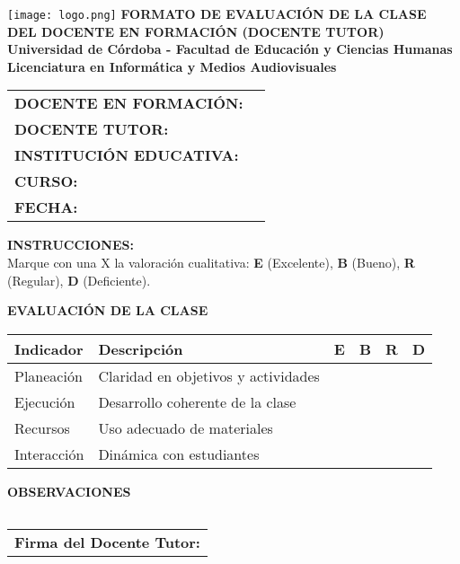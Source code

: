 \documentclass[a4paper,12pt]{article}
\begin{document}
\begin{center}
    \vspace*{1cm}
    \texttt{[image: logo.png]} %
    \vspace{0.5cm}
    \textbf{\Large FORMATO DE EVALUACIÓN DE LA CLASE DEL DOCENTE EN FORMACIÓN (DOCENTE TUTOR)} \\
    \vspace{0.5cm}
    \textbf{Universidad de Córdoba - Facultad de Educación y Ciencias Humanas} \\
    \textbf{Licenciatura en Informática y Medios Audiovisuales}
\end{center}

\vspace{0.5cm}
\begin{tabularx}{\textwidth}{@{}p{5cm}X@{}}
    \toprule
    \textbf{DOCENTE EN FORMACIÓN:} & \hrulefill \\
    \textbf{DOCENTE TUTOR:} & \hrulefill \\
    \textbf{INSTITUCIÓN EDUCATIVA:} & \hrulefill \\
    \textbf{CURSO:} & \hrulefill \\
    \textbf{FECHA:} & \hrulefill \\
    \bottomrule
\end{tabularx}

\vspace{0.5cm}
\noindent
\textbf{INSTRUCCIONES:} \\
Marque con una X la valoración cualitativa: \textbf{E} (Excelente), \textbf{B} (Bueno), \textbf{R} (Regular), \textbf{D} (Deficiente).

\vspace{0.5cm}
\noindent
\textbf{EVALUACIÓN DE LA CLASE}
\begin{table}[h]
    \centering
    \scriptsize
    \begin{tabularx}{\textwidth}{|p{5cm}|X|c|c|c|c|}
        \hline
        \textbf{Indicador} & \textbf{Descripción} & \textbf{E} & \textbf{B} & \textbf{R} & \textbf{D} \\
        \hline
        Planeación & Claridad en objetivos y actividades & & & & \\ \hline
        Ejecución & Desarrollo coherente de la clase & & & & \\ \hline
        Recursos & Uso adecuado de materiales & & & & \\ \hline
        Interacción & Dinámica con estudiantes & & & & \\ \hline
    \end{tabularx}
\end{table}

\vspace{0.5cm}
\noindent
\textbf{OBSERVACIONES}
\begin{tabularx}{\textwidth}{|X|}
    \hline
    \vspace{3cm} \\ \hline
\end{tabularx}

\vspace{0.5cm}
\begin{center}
    \begin{tabular}{p{7cm}}
        \hline
        \textbf{Firma del Docente Tutor:} \hrulefill \\
    \end{tabular}
\end{center}
\end{document}
